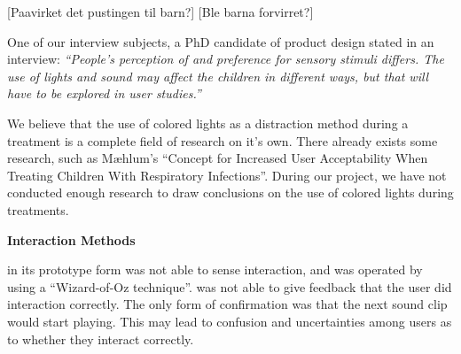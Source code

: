 [Paavirket det pustingen til barn?]
[Ble barna forvirret?]

One of our interview subjects, a PhD candidate of product design stated in an interview: 
\textit{``People's perception of and preference for sensory stimuli differs. The use of lights and sound may affect the children in different ways, but that will have to be explored in user studies.''} 

We believe that the use of colored lights as a distraction method during a treatment is a complete field of research on it's own. There already exists some research, such as M\ae hlum's ``Concept for Increased User Acceptability When Treating Children With Respiratory Infections\cite{mahlum2013}''. During our project, we have not conducted enough research to draw conclusions on the use of colored lights during treatments. 


\textbf{Interaction Methods}

\buddy{} in its prototype form was not able to sense interaction, and was operated by using a ``Wizard-of-Oz technique''\cite{wilson1988rapid}. \buddy{} was not able to give feedback that the user did interaction correctly. The only form of confirmation was that the next sound clip would start playing. This may lead to confusion and uncertainties among users as to whether they interact correctly. 

